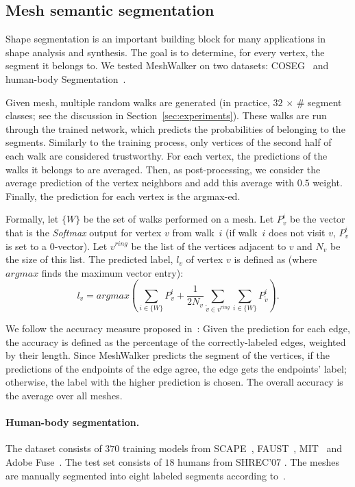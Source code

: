 \documentclass[acmtog]{acmart}
\begin{document}
\subsection{Mesh semantic segmentation}
\label{subsec:segmentation}
Shape segmentation is an important building block for many applications in shape analysis and synthesis.
The goal is to determine, for every vertex, the segment it belongs to.
We tested  MeshWalker on two datasets: COSEG~\cite{wang2012active} and human-body Segmentation~\cite{maron2017convolutional}. 

Given mesh, multiple  random walks are generated (in practice, $32$ $\times$ \# segment classes; see the discussion in Section~\ref{sec:experiments}).
These walks are run through the trained network, which predicts the probabilities of belonging to the segments.
Similarly to the training process, only vertices of the second half of each walk are considered trustworthy.
For each vertex, the predictions of the walks it belongs to are averaged.
Then, as post-processing, we consider the average prediction of the vertex neighbors and add  this average with $0.5$ weight. 
Finally, the prediction for each vertex is the argmax-ed.

Formally, let $\{W\}$ be the set of walks performed on a mesh.
Let $P^i_{v}$ be the vector that is the {\em Softmax} output for vertex $v$ from walk~$i$ (if walk~$i$ does not visit $v$, $P^i_{v}$ is set to a $0$-vector).
Let $v^{ring}$ be the list of the vertices adjacent to $v$ and $N_v$ be the size of this list.
The predicted label, $l_v$  of vertex $v$ is defined as (where $argmax$ finds the maximum vector entry):
\begin{equation}
\label{eqn:lv}
l_v=argmax(\sum_{i \in \{W\}} P^i_{v} + 
 \frac{1}{2N_v} 
\sum_{\tilde{v} \in v^{ring}} 
\sum_{i \in \{W\}} P^i_{{\tilde{v}}}).
\end{equation}

We follow the accuracy measure proposed in~\cite{hanocka2019meshcnn}:
Given the prediction for each edge, the accuracy is defined as the percentage of the correctly-labeled edges, weighted by their length.
Since MeshWalker predicts the segment of the vertices, if the predictions of the endpoints of the edge agree, the edge gets the endpoints' label; otherwise,  the label with the higher prediction is chosen.
The overall accuracy is the average over all meshes.

\paragraph{Human-body segmentation.}
The dataset consists of $370$ training models from SCAPE~\cite{anguelov2005scape}, FAUST~\cite{bogo2014faust}, MIT~\cite{vlasic2008articulated} and Adobe Fuse~\cite{Adobe2016}.
The test set consists of $18$ humans from SHREC'07 \cite{giorgi2007shape} .
The meshes are manually segmented into eight labeled segments according to~\cite{kalogerakis2010learning}. 
\end{document}
